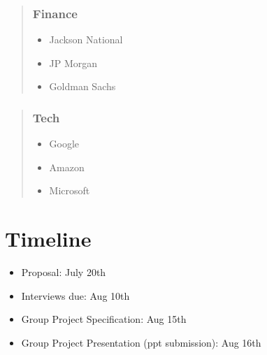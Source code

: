 \documentclass[
]{book}
\providecommand{\tightlist}{%
  \setlength{\itemsep}{0pt}\setlength{\parskip}{0pt}}
\begin{document}
\begin{quote}
\hypertarget{finance}{%
\subsubsection{\texorpdfstring{\textbf{Finance}}{Finance}}\label{finance}}

\begin{itemize}
\tightlist
\item
  Jackson National
\item
  JP Morgan
\item
  Goldman Sachs
\end{itemize}
\end{quote}

\begin{quote}
\hypertarget{tech}{%
\subsubsection{\texorpdfstring{\textbf{Tech}}{Tech}}\label{tech}}

\begin{itemize}
\tightlist
\item
  Google
\item
  Amazon
\item
  Microsoft
\end{itemize}
\end{quote}

\hypertarget{timeline}{%
\section{\texorpdfstring{\textbf{Timeline}}{Timeline}}\label{timeline}}

\begin{itemize}
\tightlist
\item
  Proposal: July 20th
\item
  Interviews due: Aug 10th
\item
  Group Project Specification: Aug 15th
\item
  Group Project Presentation (ppt submission): Aug 16th
\end{itemize}

  
\end{document}
